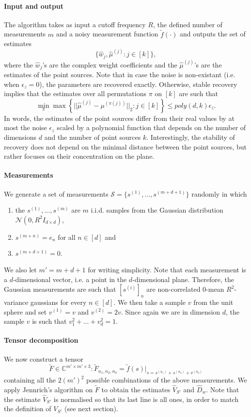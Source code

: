\paragraph{Input and output} The algorithm takes as input a cutoff frequency $R$, the defined number of measurements $m$ and a noisy measurement function $\tilde{f}(\cdot)$ and outputs the set of estimates $$\{\widehat{w}_j,\widehat{\mu}^{(j)}:j\in[k]\},$$ where the $\widehat{w}_j$'s are the complex weight coefficients and the $\widehat{\mu}^{(j)}$'s are the estimates of the point sources. Note that in case the noise is non-existant (i.e. when $\epsilon_z=0$), the parameters are recovered exactly. Otherwise, stable recovery implies that the estimates over all permutations $\pi$ on $[k]$ are such that $$\min_\pi\max\left\{||\widehat{\mu}^{(j)}-\mu^{(\pi(j))}||_2:j\in[k]\right\}\leq poly(d,k)\epsilon_z.$$ In words, the estimates of the point sources differ from their real values by at most the noise $\epsilon_z$ scaled by a polynomial function that depends on the number of dimensions $d$ and the number of point sources $k$. Interestingly, the stability of recovery does not depend on the minimal distance between the point sources, but rather focuses on their concentration on the plane.
\paragraph{Measurements} We generate a set of measurements $\mathcal{S}=\{s^{(1)},\ldots,s^{(m+d+1)}\}$ randomly in which
\begin{enumerate}
    \item the $s^{(1)},\ldots,s^{(m)}$ are $m$ i.i.d. samples from the Gaussian distribution $\mathcal{N}(0,R^2I_{d\times d})$,
    \item $s^{(m+n)}=e_n$ for all $n\in[d]$ and
    \item $s^{(m+d+1)}=0$.
\end{enumerate}
We also let $m'=m+d+1$ for writing simplicity. Note that each measurement is a $d$-dimensional vector, i.e. a point in the $d$-dimensional plane. Therefore, the Gaussian measurements are such that $[s^{(i)}]_n$ are non-correlated 0-mean $R^2$-variance gaussians for every $n\in[d]$. We then take a sample $v$ from the unit sphere and set $v^{(1)}=v$ and $v^{(2)}=2v$. Since again we are in dimension $d$, the sample $v$ is such that $v_1^2+\ldots+v_d^2=1$.
\paragraph{Tensor decomposition} We now construct a tensor $$\tilde{F}\in\mathbb{C}^{m'\times m'\times 3}:\tilde{F}_{n_1,n_2,n_3}=\tilde{f}(s)|_{s=s^{(n_1)}+s^{(n_2)}+v^{(n_3)}}$$ containing all the $2(m')^2$ possible combinations of the above measurements. We apply Jennrich's algorithm on $\tilde{F}$ to obtain the estimates $\widehat{V}_{S'}$ and $\widehat{D}_w$. Note that the estimate $\widehat{V}_{S'}$ is normalised so that its last line is all ones, in order to match the definition of $V_{S'}$ (see next section).
